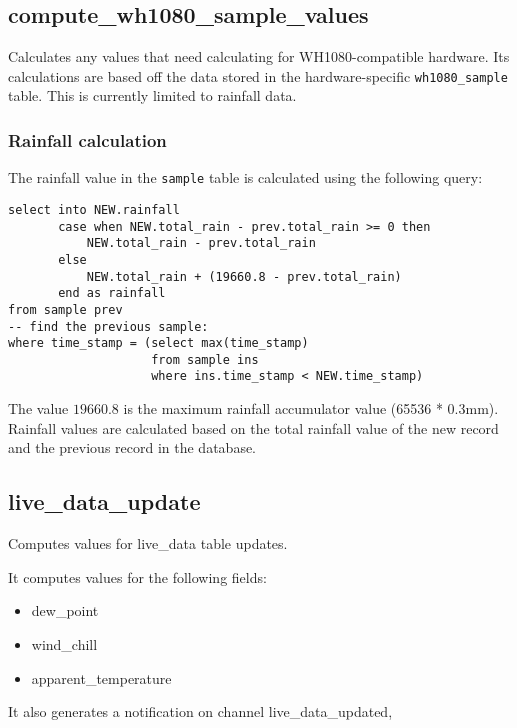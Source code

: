 \documentclass[a4paper,10pt]{book}
\begin{document}
\subsection{compute\_wh1080\_sample\_values}
\label{compute_wh1080_sample_values}

Calculates any values that need calculating for WH1080-compatible hardware. Its calculations are based off the data stored in the hardware-specific \verb|wh1080_sample| table. This is currently limited to rainfall data.

\subsubsection{Rainfall calculation}
The rainfall value in the \verb|sample| table is calculated using the following query:

\lstset{
  language=SQL,
  frame=single,
  numbers=left,
  basicstyle=\small,
  commentstyle=\emph
}

\begin{lstlisting}
select into NEW.rainfall
       case when NEW.total_rain - prev.total_rain >= 0 then
           NEW.total_rain - prev.total_rain
       else
           NEW.total_rain + (19660.8 - prev.total_rain)
       end as rainfall
from sample prev
-- find the previous sample:
where time_stamp = (select max(time_stamp)
                    from sample ins
                    where ins.time_stamp < NEW.time_stamp)
\end{lstlisting}

The value $19660.8$ is the maximum rainfall accumulator value (65536 * 0.3mm). Rainfall values are calculated based on the total rainfall value of the new record and the previous record in the database.

\subsection{live\_data\_update}
Computes values for live\_data table updates.

It computes values for the following fields:
\begin{itemize}
\item dew\_point
\item wind\_chill
\item apparent\_temperature
\end{itemize}

It also generates a notification on channel live\_data\_updated,
\end{document}
